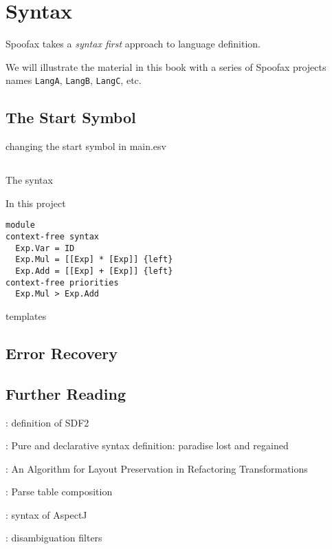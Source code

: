 \chapter{Syntax}

Spoofax takes a \emph{syntax first} approach to language definition.


We will illustrate the material in this book with a series of Spoofax
projects names \texttt{LangA}, \texttt{LangB}, \texttt{LangC}, etc. 


\section{The Start Symbol}

changing the start symbol in main.esv


\section{}

The syntax 

In this project 

\begin{verbatim}
module 
context-free syntax
  Exp.Var = ID
  Exp.Mul = [[Exp] * [Exp]] {left}
  Exp.Add = [[Exp] + [Exp]] {left}
context-free priorities
  Exp.Mul > Exp.Add
\end{verbatim}

templates \cite{VollebregtKV12}

\section{Error Recovery}

\cite{JongeKVS12}


\section{Further Reading}

\cite{Vis97.thesis}: definition of SDF2

\cite{KatsVW10}: Pure and declarative syntax definition: paradise lost and
regained


\cite{JongeV11}: An Algorithm for Layout Preservation in Refactoring
Transformations

\cite{BravenboerV08}: Parse table composition

\cite{BravenboerTV06}: syntax of AspectJ

\cite{KlintV94,BrandSVV02}: disambiguation filters